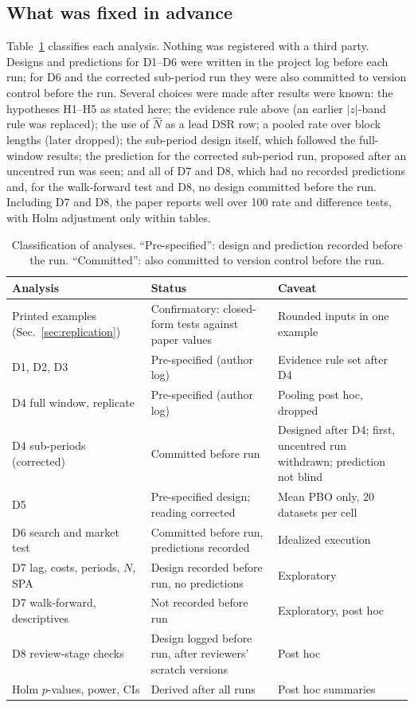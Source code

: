 \documentclass[11pt,a4paper]{article}
\begin{document}
\subsection{What was fixed in advance}\label{sec:prereg}
Table~\ref{tab:classification} classifies each analysis. Nothing was registered with a third party. Designs and predictions for D1--D6 were written in the project log before each run; for D6 and the corrected sub-period run they were also committed to version control before the run. Several choices were made after results were known: the hypotheses H1--H5 as stated here; the evidence rule above (an earlier $|z|$-band rule was replaced); the use of $\hat N$ as a lead DSR row; a pooled rate over block lengths (later dropped); the sub-period design itself, which followed the full-window results; the prediction for the corrected sub-period run, proposed after an uncentred run was seen; and all of D7 and D8, which had no recorded predictions and, for the walk-forward test and D8, no design committed before the run. Including D7 and D8, the paper reports well over 100 rate and difference tests, with Holm adjustment only within tables.

\begin{table}[htbp]
\centering\small
\caption{Classification of analyses. ``Pre-specified'': design and prediction recorded before the run. ``Committed'': also committed to version control before the run.}\label{tab:classification}
\begin{tabularx}{\textwidth}{@{}l>{\raggedright\arraybackslash}X>{\raggedright\arraybackslash}p{4.6cm}@{}}
\toprule
Analysis & Status & Caveat \\
\midrule
Printed examples (Sec.~\ref{sec:replication}) & Confirmatory: closed-form tests against paper values & Rounded inputs in one example \\
D1, D2, D3 & Pre-specified (author log) & Evidence rule set after D4 \\
D4 full window, replicate & Pre-specified (author log) & Pooling post hoc, dropped \\
D4 sub-periods (corrected) & Committed before run & Designed after D4; first, uncentred run withdrawn; prediction not blind \\
D5 & Pre-specified design; reading corrected & Mean PBO only, 20 datasets per cell \\
D6 search and market test & Committed before run, predictions recorded & Idealized execution \\
D7 lag, costs, periods, $N$, SPA & Design recorded before run, no predictions & Exploratory \\
D7 walk-forward, descriptives & Not recorded before run & Exploratory, post hoc \\
D8 review-stage checks & Design logged before run, after reviewers' scratch versions & Post hoc \\
Holm $p$-values, power, CIs & Derived after all runs & Post hoc summaries \\
\bottomrule
\end{tabularx}
\end{table}
\end{document}
